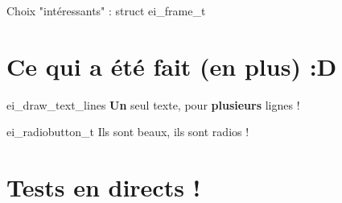 \documentclass[10pt]{beamer}
\begin{document}
\begin{frame}{Choix "intéressants" : struct ei\_frame\_t}
    \begin{center}
        
    \end{center}
\end{frame}

\section{Ce qui a été fait (en plus) :D}

\begin{frame}{ei\_draw\_text\_lines}
    \textbf{Un} seul texte, pour \textbf{plusieurs} lignes !
\end{frame}


\begin{frame}{ei\_radiobutton\_t}
    Ils sont beaux, ils sont radios !
\end{frame}

\section{Tests en directs !}

\end{document}

